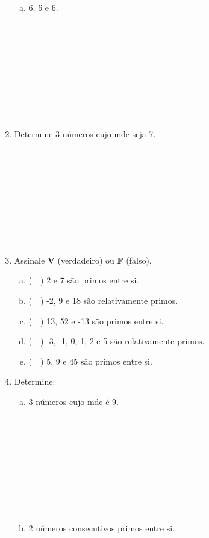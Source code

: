 \documentclass[a4paper,14pt]{article}
\begin{document}
\begin{multicols}{2}
\begin{enumerate}
\begin{enumerate}[a)]
				\item 6, 6 e 6. \\\\\\\\\\\\\\\\\\\\
			\end{enumerate}
			\item Determine 3 números cujo mdc seja 7. \\\\\\\\\\\\\\\\\\\\
			\item Assinale \textbf{V} (verdadeiro) ou \textbf{F} (falso).
			\begin{enumerate}[a)]
				\item (~~) 2 e 7 são primos entre si.
				\item (~~) -2, 9 e 18 são relativamente primos.
				\item (~~) 13, 52 e -13 são primos entre si.
				\item (~~) -3, -1, 0, 1, 2 e 5 são relativamente primos.
				\item (~~) 5, 9 e 45 são primos entre si.
			\end{enumerate}
			\item Determine:
			\begin{enumerate}[a)]
				\item 3 números cujo mdc é 9. \\\\\\\\\\\\\\\\\\\\
				\item 2 números consecutivos primos entre si. \\\\\\\\\\\\\\\\\\\\\\\\

\end{enumerate}
\end{enumerate}
\end{multicols}
\end{document}
